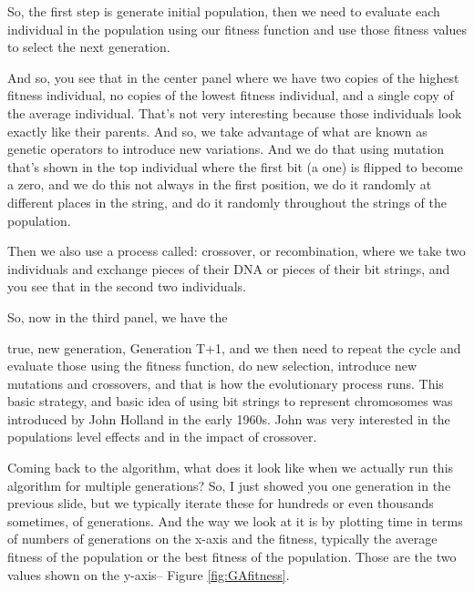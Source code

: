 \documentclass[]{article}
\begin{document}
So, the first step is generate initial population,
then we need to evaluate each individual
in the population using our fitness function
and use those fitness values to select
the next generation.

And so, you see that in the center panel
where we have two copies of the highest
fitness individual, no copies of the lowest
fitness individual, and a single copy
of the average individual.
That's not very interesting because
those individuals look exactly like their parents.
And so, we take advantage of what are known as
genetic operators to introduce new variations.
And we do that using mutation that's shown
in the top individual where the first bit (a one)
is flipped to become a zero, and we do this
not always in the first position, we do it
randomly at different places in the string,
and do it randomly throughout the strings
of the population.

Then we also use a process called:
crossover, or recombination, where we take
two individuals and exchange pieces of their
DNA or pieces of their bit strings, and
you see that in the second two individuals.

So, now in the third panel, we have the

true, new generation, Generation T+1, and
we then need to repeat the cycle
and evaluate those using the fitness function,
do new selection, introduce new mutations
and crossovers, and that is how
the evolutionary process runs.
This basic strategy, and basic idea of using
bit strings to represent chromosomes was
introduced by John Holland in the early 1960s.
John was very interested in the
populations level effects and in the
impact of crossover.

Coming back to the algorithm,
what does it look like when we actually
run this algorithm for multiple generations?
So, I just showed you one generation in the previous slide,
but we typically iterate these for hundreds
or even thousands sometimes, of generations.
And the way we look at it is by plotting time
in terms of numbers of generations on the x-axis
and the fitness, typically the average fitness
of the population or the best fitness of
the population. Those are the two values
shown  on the y-axis-- Figure \ref{fig:GAfitness}.
\end{document}

